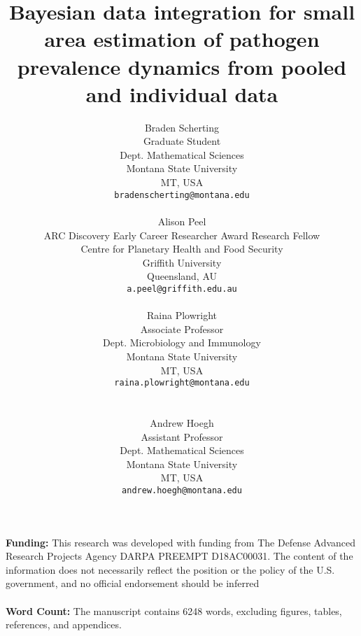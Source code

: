 \documentclass{article}
\title{Bayesian data integration for small area estimation of pathogen prevalence dynamics from pooled and individual data}
\author{
  Braden Scherting \\
  Graduate Student\\
  Dept. Mathematical Sciences \\
  Montana State University \\
  MT, USA \\
  \texttt{bradenscherting@montana.edu} \\
\\
  Alison Peel \\
  ARC Discovery Early Career Researcher Award Research Fellow\\
  Centre for Planetary Health and Food Security \\
  Griffith University \\
  Queensland, AU\\
    \texttt{a.peel@griffith.edu.au}\\
\\
  Raina Plowright \\
  Associate Professor\\
  Dept. Microbiology and Immunology \\
  Montana State University \\
  MT, USA\\
  \texttt{raina.plowright@montana.edu} \\\\
\\
  Andrew Hoegh \\
  Assistant Professor\\
  Dept. Mathematical Sciences \\
  Montana State University \\
  MT, USA \\
  \texttt{andrew.hoegh@montana.edu} \\}
\begin{document}
\maketitle

\noindent
{\bf Funding:} This  research  was  developed  with  funding  from  The  Defense Advanced  Research  Projects  Agency  DARPA  PREEMPT D18AC00031. The content of the information does not necessarily reflect the position or the policy of the U.S. government, and no official endorsement should be inferred
\\
\\

\noindent
{\bf Word Count:} The manuscript contains 6248 words, excluding figures, tables, references, and appendices.

\end{document}
